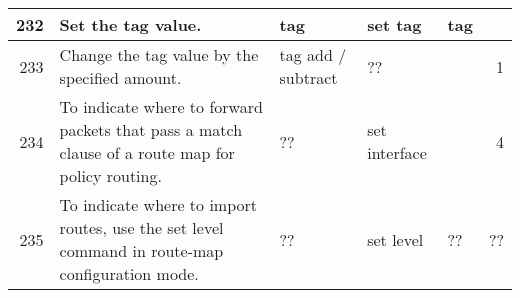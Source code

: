 \documentclass[letterpaper]{article}
\begin{document}
\begin{center}
\begin{supertabular}{|r |p{6cm} |p{2cm} |p{2cm} |p{2cm} |r|}
232 &
Set the tag value. 
& tag & set tag & tag &\\
\hline

233 &
Change the tag value by the specified amount.
& tag add / subtract & ?? &  & 1 \\
\hline

234 &
To indicate where to forward packets that pass a match clause of a route map for
policy routing.
& ?? & set interface &  & 4 \\
\hline

235 &
To indicate where to import routes, use the set level command in route-map
configuration mode.
& ?? & set level & ?? & ?? \\

\end{supertabular}
\end{center}
\end{document}
